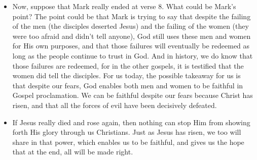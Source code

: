 \begin{itemize}
{  do not have verses 9-20.  Yet the account in those verses are credible, for
  they are testified to in other gospels.}
  \item{Now, suppose that Mark really ended at verse 8.  What could be Mark's
  point?  The point could be that Mark is trying to say that despite the
  failing of the men (the disciples deserted Jesus) and the failing of the
  women (they were too afraid and didn't tell anyone), God still uses these
  men and women for His own purposes, and that those failures will eventually
  be redeemed as long as the people continue to trust in God.  And in
  history, we do know that those failures are redeemed, for in the other
  gospels, it is testified that the women did tell the disciples.  For us
  today, the possible takeaway for us is that despite our fears, God enables
  both men and women to be faithful in Gospel proclamation.  We can be
  faithful despite our fears because Christ has risen, and that all the
  forces of evil have been decisively defeated.}
  \item{If Jesus really died and rose again, then nothing can stop Him from
  showing forth His glory through us Christians.  Just as Jesus has risen, we
  too will share in that power, which enables us to be faithful, and gives us
  the hope that at the end, all will be made right.}



\end{itemize}